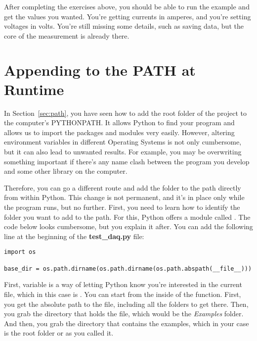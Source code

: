 
After completing the exercises above, you should be able to run the example and get the values you wanted. You're getting currents in amperes, and you're setting voltages in volts. You're still missing some details, such as saving data, but the core of the measurement is already there.

\section{Appending to the PATH at Runtime}\label{sec:appending-path}
In Section~\ref{sec:path}, you have seen how to add the root folder of the project to the computer's PYTHONPATH. It allows Python to find your program and allows us to import the packages and modules very easily. However, altering environment variables in different Operating Systems is not only cumbersome, but it can also lead to unwanted results. For example, you may be overwriting something important if there's any name clash between the program you develop and some other library on the computer.

Therefore, you can go a different route and add the folder to the path directly from within Python. This change is not permanent, and it's in place only while the program runs, but no further. First, you need to learn how to identify the folder you want to add to the path. For this, Python offers a module called . The code below looks cumbersome, but you explain it after. You can add the following line at the beginning of the \textbf{test\_daq.py} file:

\begin{verbatim}
import os

base_dir = os.path.dirname(os.path.dirname(os.path.abspath(__file__)))
\end{verbatim}

First,  variable is a way of letting Python know you're interested in the current file, which in this case is . You can start from the inside of the function. First, you get the absolute path to the file, including all the folders to get there. Then, you grab the directory that holds the file, which would be the \emph{Examples} folder. And then, you grab the directory that contains the examples, which in your case is the root folder or  as you called it.

